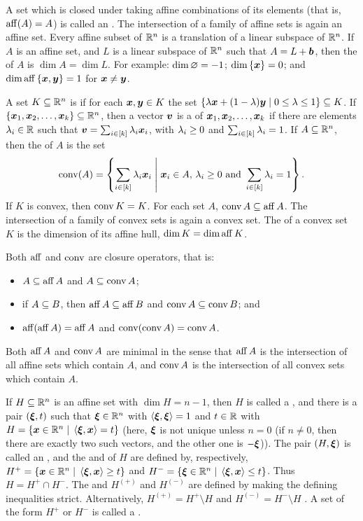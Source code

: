 A set which is closed under taking affine combinations of its elements (that is, \(\operatorname{aff}(A)=A\)) is called an .  The intersection of a family of affine sets is again an affine set.  Every affine subset of \(\mathbb{R}^{n}\) is a translation of a linear subspace of \(\mathbb{R}^{n}\).  If \(A\) is an affine set, and \(L\) is a linear subspace of \(\mathbb{R}^{n}\) such that \(A=L+\bm{b}\), then the  of \(A\) is \(\dim A=\dim L\).  For example: \(\dim\varnothing=-1\); \(\dim\left\{\bm{x}\right\}=0\); and \(\dim\operatorname{aff}\left\{\bm{x},\bm{y}\right\}=1\) for \(\bm{x}\ne\bm{y}\).

A set \(K\subseteq \mathbb{R}^{n}\) is  if for each \(\bm{x}, \bm{y}\in K\) the set \(\setb{\la\ve x+(1-\la)\ve y}{0\le\la\le1}\sbset K\).  If \(\left\{\bm{x}_1,\bm{x}_2,\dotsc, \bm{x}_k\right\}\subseteq \mathbb{R}^{n}\), then a vector \(\bm{v}\) is a  of \(\bm{x}_1,\bm{x}_2,\dotsc, \bm{x}_k\) if there are elements \(\lambda_i\in\mathbb{R}\) such that \(\bm{v} = \sum_{i\in\left[k\right]}\lambda_i\bm{x}_i\), with \(\lambda_i\ge0\) and \(\sum_{i\in\left[k\right]}\lambda_i=1\).  If \(A\subseteq\mathbb{R}^{n}\), then the  of \(A\) is the set
    \[
        \conv(A)
            =\setb{\sum_{i\in\brac k}\la_i\ve x_i}{\ve x_i\in A,\,\la_i\ge0\text{ and }\sum_{i\in\brac k}\la_i=1}.
    \]
If \(K\) is convex, then \(\operatorname{conv} K=K\).  For each set \(A\), \(\operatorname{conv} A\subseteq\operatorname{aff} A\).  The intersection of a family of convex sets is again a convex set.  The  of a convex set \(K\) is the dimension of its affine hull, \(\dim K=\dim\operatorname{aff} K\).

Both \(\operatorname{aff}\) and \(\operatorname{conv}\) are closure operators, that is:
    \begin{itemize}
        \item   \(A\subseteq\operatorname{aff} A\) and \(A\subseteq\operatorname{conv} A\);
        \item   if \(A\subseteq B\), then \(\operatorname{aff} A\subseteq\operatorname{aff} B\) and \(\operatorname{conv} A\subseteq \operatorname{conv} B\); and
        \item\(\operatorname{aff}(\operatorname{aff} A)=\operatorname{aff} A\) and \(\operatorname{conv}(\operatorname{conv} A)=\operatorname{conv} A\).
    \end{itemize}
Both \(\operatorname{aff} A\) and \(\operatorname{conv} A\) are minimal in the sense that \(\operatorname{aff} A\) is the intersection of all affine sets which contain \(A\), and \(\operatorname{conv} A\) is the intersection of all convex sets which contain \(A\).

If \(H\subseteq\mathbb{R}^{n}\) is an affine set with \(\dim H=n-1\), then \(H\) is called a , and there is a pair \((\bm{\xi},t)\) such that \(\bm{\xi}\in\mathbb{R}^{n}\) with \(\left\langle\bm{\xi},\bm{\xi}\right\rangle=1\) and \(t\in\mathbb{R}\) with \(H=\setb{\ve x\in\R n}{\ip{\ve\xi}{\ve x}=t}\) (here, \(\bm{\xi}\) is not unique unless \(n=0\) (if \(n\ne0\), then there are exactly two such vectors, and the other one is \(-\bm{\xi}\))).  The pair \((H, \bm{\xi})\) is called an , and the  and  of \(H\) are defined by, respectively, \(H^+=\setb{\ve x\in\R n}{\ip{\ve\xi}{\ve x}\ge t}\) and \(H^-=\setb{\ve\xi\in\R n}{\ip{\ve\xi}{\ve x}\le t}\).  Thus \(H=H^+\cap H^-\).  The  and   \(H^{(+)}\) and \(H^{(-)}\) are defined by making the defining inequalities strict.  Alternatively, \(H^{(+)}=H^+\setminus H\) and \(H^{(-)}=H^-\setminus H\) .  A set of the form \(H^+\) or \(H^-\) is called a .

